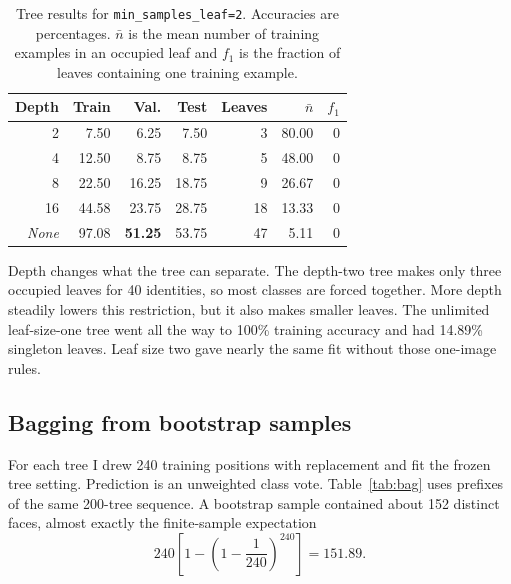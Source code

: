 \documentclass[10pt,twocolumn,letterpaper]{article}
\newcommand{\pct}[1]{#1\%}
\newcommand{\NA}{\textit{None}}
\begin{document}
\begin{table}[t]
\centering
\caption{Tree results for \texttt{min\_samples\_leaf=2}. Accuracies are percentages. $\bar n$ is the mean number of training examples in an occupied leaf and $f_1$ is the fraction of leaves containing one training example.}
\label{tab:tree}
\scriptsize
\begin{tabular}{r@{\hspace{5pt}}rrrrrr}
\toprule
Depth & Train & Val. & Test & Leaves & $\bar n$ & $f_1$\\
\midrule
2 & 7.50 & 6.25 & 7.50 & 3 & 80.00 & 0\\
4 & 12.50 & 8.75 & 8.75 & 5 & 48.00 & 0\\
8 & 22.50 & 16.25 & 18.75 & 9 & 26.67 & 0\\
16 & 44.58 & 23.75 & 28.75 & 18 & 13.33 & 0\\
\NA & 97.08 & \textbf{51.25} & 53.75 & 47 & 5.11 & 0\\
\bottomrule
\end{tabular}
\end{table}

Depth changes what the tree can separate. The depth-two tree makes only three occupied leaves for 40 identities, so most classes are forced together. More depth steadily lowers this restriction, but it also makes smaller leaves. The unlimited leaf-size-one tree went all the way to \pct{100} training accuracy and had \pct{14.89} singleton leaves. Leaf size two gave nearly the same fit without those one-image rules.

\subsection{Bagging from bootstrap samples}
For each tree I drew 240 training positions with replacement and fit the frozen tree setting. Prediction is an unweighted class vote. Table~\ref{tab:bag} uses prefixes of the same 200-tree sequence. A bootstrap sample contained about 152 distinct faces, almost exactly the finite-sample expectation
\begin{equation}
240\left[1-\left(1-\frac{1}{240}\right)^{240}\right]=151.89.
\end{equation}
\end{document}
